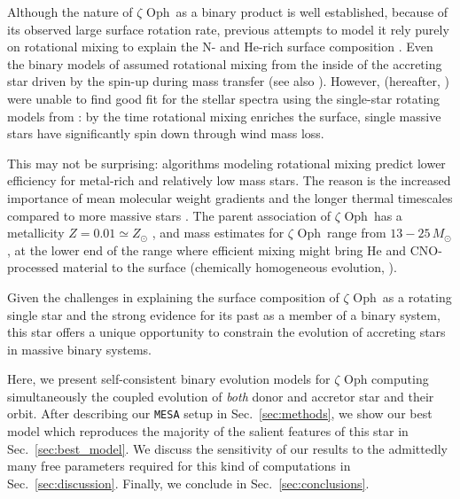 \documentclass[twocolumn,twocolappendix,trackchanges]{aastex63}
\DeclareRobustCommand{\Secref}[1]{Sec.~\ref{#1}}
\newcommand{\zoph}{$\zeta$ Oph}
\begin{document}
Although the nature of \zoph\ as a binary product is well established,
because of its observed large surface rotation rate, previous attempts
to model it rely purely on rotational mixing to explain the N- and
He-rich surface composition \cite[e.g.,][]{maeder:00}. Even the binary
models of \cite{vanrensbergen:96} assumed rotational mixing from the
inside of the accreting star driven by the spin-up during mass
transfer (see also \citealt{cantiello:07}). However, \cite{villamariz:05}
(hereafter, ) were unable to find good fit
for the stellar spectra using the single-star rotating models from
\cite{meynet:00, meynet:03}: by the time rotational mixing enriches
the surface, single massive stars have significantly spin down through
wind mass loss.

This may not be surprising: algorithms modeling rotational mixing
predict lower efficiency for metal-rich and relatively low mass
stars. The reason is the increased importance of mean molecular weight
gradients and the longer thermal timescales compared to more massive
stars \citep[e.g.,][]{yoon:06, perna:14}. The parent association of
\zoph\ has a metallicity $Z=0.01\simeq Z_\odot$ \citep[based on
asteroseismology from][]{murphy:21}, and mass estimates for \zoph\
range from $13-25\,M_\odot$, at the lower end of the range where
efficient mixing might bring He and CNO-processed material to the
surface (chemically homogeneous evolution, \citealt{maeder:00}).

Given the challenges in explaining the surface composition of \zoph\
as a rotating single star and the strong
evidence for its past as a member of a binary system, this star offers
a unique opportunity to constrain the evolution of accreting stars in
massive binary systems.

Here, we present self-consistent binary evolution models for
$\zeta$ Oph computing simultaneously the coupled evolution of
\emph{both} donor and accretor star and their orbit. After describing
our \texttt{MESA} setup in \Secref{sec:methods}, we show our best model which
reproduces the majority of the salient features of this star in
\Secref{sec:best_model}. %
We discuss the
sensitivity of our results to the admittedly many free parameters
required for this kind of computations in
\Secref{sec:discussion}. Finally, we conclude in
\Secref{sec:conclusions}.
\end{document}
